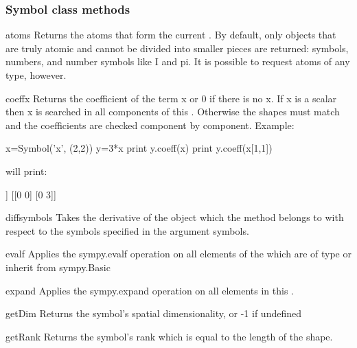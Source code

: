 \subsubsection{Symbol class methods}
\begin{methoddesc}[Symbol]{atoms}{}
Returns the atoms that form the current \SYMBOL.
By default, only objects that are truly atomic and cannot be divided
into smaller pieces are returned: symbols, numbers, and number
symbols like I and pi. It is possible to request atoms of any type,
however.
\end{methoddesc}

\begin{methoddesc}[Symbol]{coeff}{x }
Returns the coefficient of the term x or 0 if there is no x.
If x is a scalar \SYMBOL then x is searched in all components of
this \SYMBOL. Otherwise the shapes must match and the coefficients are
checked component by component.
Example:
\begin{python}
     x=Symbol('x', (2,2))
     y=3*x
     print y.coeff(x)
     print y.coeff(x[1,1])
\end{python}
will print:
\begin{python}
     [[3 3]
      [3 3]]
     [[0 0]
      [0 3]]
\end{python} 
\end{methoddesc}
\begin{methoddesc}[Symbol]{diff}{symbols}
Takes the derivative of the \SYMBOL object which the method belongs to with respect to the symbols specified in the argument symbols.
\end{methoddesc}
\begin{methoddesc}[Symbol]{evalf}{}
Applies the sympy.evalf operation on all elements of the \SYMBOL which are of type or inherit from sympy.Basic 
\end{methoddesc}
\begin{methoddesc}[Symbol]{expand}{}
Applies the sympy.expand operation on all elements in this \SYMBOL.
\end{methoddesc}
\begin{methoddesc}[Symbol]{getDim}{}
Returns the symbol's spatial dimensionality, or -1 if undefined
\end{methoddesc}
\begin{methoddesc}[Symbol]{getRank}{}
Returns the symbol's rank which is equal to the length of the shape.
\end{methoddesc}
